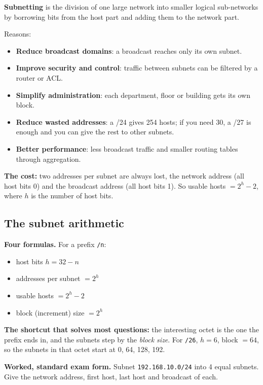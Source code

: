 \documentclass[11pt,a4paper]{article}
\begin{document}
\begin{solbox}
\textbf{Subnetting} is the division of one large network into smaller logical sub-networks by borrowing bits from the host part and adding them to the network part.

Reasons:
\begin{itemize}
\item \textbf{Reduce broadcast domains}: a broadcast reaches only its own subnet.
\item \textbf{Improve security and control}: traffic between subnets can be filtered by a router or ACL.
\item \textbf{Simplify administration}: each department, floor or building gets its own block.
\item \textbf{Reduce wasted addresses}: a /24 gives 254 hosts; if you need 30, a /27 is enough and you can give the rest to other subnets.
\item \textbf{Better performance}: less broadcast traffic and smaller routing tables through aggregation.
\end{itemize}

\textbf{The cost:} two addresses per subnet are always lost, the network address (all host bits 0) and the broadcast address (all host bits 1). So usable hosts $= 2^h - 2$, where $h$ is the number of host bits.
\end{solbox}

\subsection{The subnet arithmetic}

\begin{rememberbox}
\textbf{Four formulas.} For a prefix \texttt{/n}:
\begin{itemize}
\item host bits $h = 32 - n$
\item addresses per subnet $= 2^{h}$
\item usable hosts $= 2^{h} - 2$
\item block (increment) size $= 2^{h}$
\end{itemize}
\textbf{The shortcut that solves most questions:} the interesting octet is the one the prefix ends in, and the subnets step by the \emph{block size}. For \texttt{/26}, $h = 6$, block $= 64$, so the subnets in that octet start at 0, 64, 128, 192.
\end{rememberbox}

\begin{pyqbox}
\textbf{Worked, standard exam form.} Subnet \texttt{192.168.10.0/24} into 4 equal subnets. Give the network address, first host, last host and broadcast of each.
\end{pyqbox}
\end{document}
